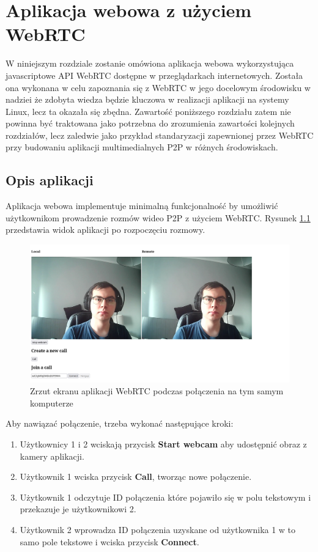 \chapter{Aplikacja webowa z użyciem WebRTC}

W niniejszym rozdziale zostanie omówiona aplikacja webowa wykorzystująca javascriptowe API WebRTC
dostępne w przeglądarkach internetowych. Została ona wykonana w celu zapoznania się z WebRTC w jego
docelowym środowisku w nadziei że zdobyta wiedza będzie kluczowa w realizacji aplikacji na systemy
Linux, lecz ta okazała się zbędna. Zawartość poniższego rozdziału zatem nie powinna być traktowana
jako potrzebna do zrozumienia zawartości kolejnych rozdziałów, lecz zaledwie jako przykład
standaryzacji zapewnionej przez WebRTC przy budowaniu aplikacji multimedialnych P2P w różnych
środowiskach.

\section{Opis aplikacji}

Aplikacja webowa implementuje minimalną funkcjonalność by umożliwić użytkownikom prowadzenie rozmów
wideo P2P z użyciem WebRTC. Rysunek \ref{fig:webrtc_app} przedstawia widok aplikacji po rozpoczęciu
rozmowy.

\begin{figure}[htbp]
  \centering
  \includegraphics[width=\textwidth]{img/webrtc-app}
  \caption{Zrzut ekranu aplikacji WebRTC podczas połączenia na tym samym komputerze}
  \label{fig:webrtc_app}
\end{figure}

Aby nawiązać połączenie, trzeba wykonać następujące kroki:

\begin{enumerate}
  \item Użytkownicy 1 i 2 wciskają przycisk \textbf{Start webcam} aby udostępnić obraz z kamery aplikacji.
  \item Użytkownik 1 wciska przycisk \textbf{Call}, tworząc nowe połączenie.
  \item Użytkownik 1 odczytuje ID połączenia które pojawiło się w polu tekstowym i przekazuje je użytkownikowi 2.
  \item Użytkownik 2 wprowadza ID połączenia uzyskane od użytkownika 1 w to samo pole tekstowe i wciska przycisk
        \textbf{Connect}.
\end{enumerate}


